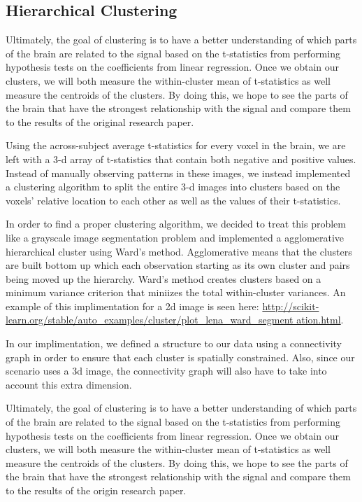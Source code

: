 \subsection{Hierarchical Clustering}

\par Ultimately, the goal of clustering is to have a better understanding of 
which parts of the brain are related to the signal based on the t-statistics 
from performing hypothesis tests on the coefficients from linear regression.
Once we obtain our clusters, we will both measure the within-cluster mean of
t-statistics as well measure the centroids of the clusters. By doing this, we 
hope to see the parts of the brain that have the strongest relationship with 
the signal and compare them to the results of the original research paper.

Using the across-subject average t-statistics for every voxel in the
brain, we are left with a 3-d array of t-statistics that contain both negative
and positive values. Instead of manually observing patterns in these images, we
instead implemented a clustering algorithm to split the entire 3-d images into
clusters based on the voxels' relative location to each other as well as the
values of their t-statistics.

\par In order to find a proper clustering algorithm, we decided to treat this
problem like a grayscale image segmentation problem and implemented a
agglomerative hierarchical cluster using Ward's method. Agglomerative means
that the clusters are built bottom up which each observation starting as its
own cluster and pairs being moved up the hierarchy. Ward's method creates
clusters based on a minimum variance criterion that miniizes the total
within-cluster variances. An example of this implimentation for a 2d image is
seen here:
\url{http://scikit-learn.org/stable/auto_examples/cluster/plot_lena_ward_segment
 ation.html}.

In our implimentation, we defined a structure to our data using a connectivity
graph in order to ensure that each cluster is spatially constrained. Also,
since our scenario uses a 3d image, the connectivity graph will also have to
take into account this extra dimension.

\par Ultimately, the goal of clustering is to have a better understanding of
which parts of the brain are related to the signal based on the t-statistics
from performing hypothesis tests on the coefficients from linear regression.
Once we obtain our clusters, we will both measure the within-cluster mean of
t-statistics as well measure the centroids of the clusters. By doing this, we
hope to see the parts of the brain that have the strongest relationship with
the signal and compare them to the results of the origin research paper.

